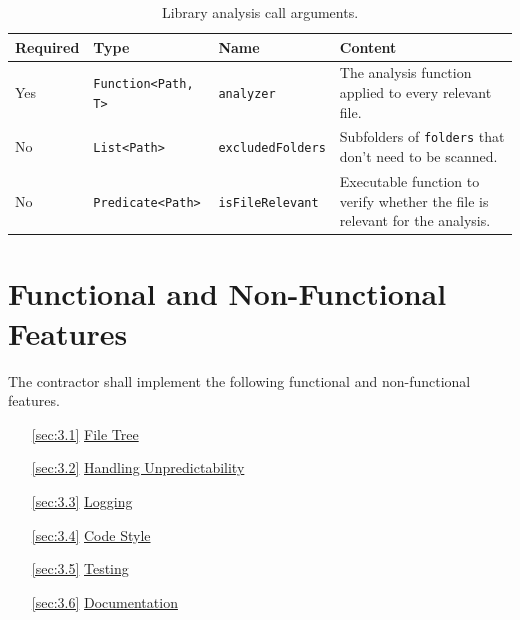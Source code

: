 \documentclass[11pt]{article} %
\begin{document}
    \begin{table}[H]
        \centering
        \begin{tabular}{p{.1\linewidth} | p{.2\linewidth} | p{.2\linewidth} | p{.4\linewidth}}
            \textbf{Required} & \textbf{Type} & \textbf{Name} & \textbf{Content}
            \\\hline
            Yes & \verb|Function<Path, T>| & \verb|analyzer| & The analysis function applied to every
            relevant\hyperref[fn:2]{\footnotemark[2]} file. \\\hline
            No & \verb|List<Path>| & \verb|excludedFolders| &
            Subfolders of
            \verb|folders|\hyperref[fn:1]{\footnotemark[1]} that don't need to be scanned. \\\hline
            No & \verb|Predicate<Path>| & \verb|isFileRelevant| & Executable function to verify whether the file is
            relevant\hyperref[fn:2]{\footnotemark[2]} for the analysis.
        \end{tabular}
        \caption{Library analysis call arguments.}
        \label{tab:call_args}
    \end{table}


    \section{Functional and Non-Functional Features}

    The contractor shall implement the following functional and non-functional features.
    \begin{itemize}
        \item[\ref{sec:3.1}] \hyperref[sec:3.1]{File Tree}
        \item[\ref{sec:3.2}] \hyperref[sec:3.2]{Handling Unpredictability}
        \item[\ref{sec:3.3}] \hyperref[sec:3.3]{Logging}
        \item[\ref{sec:3.4}] \hyperref[sec:3.4]{Code Style}
        \item[\ref{sec:3.5}] \hyperref[sec:3.5]{Testing}
        \item[\ref{sec:3.6}] \hyperref[sec:3.6]{Documentation}
    \end{itemize}
\end{document}
